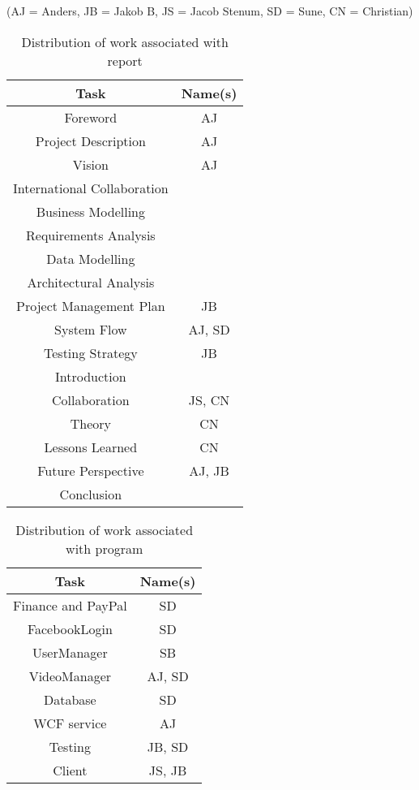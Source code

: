 \label{Distribution of Work}
(AJ = Anders, JB = Jakob B, JS = Jacob Stenum, SD = Sune, CN = Christian)\\
\begin{table}[H]
\caption{Distribution of work associated with report}
\centering

\begin{tabular}{c c}
Task & Name(s) \\ [1.5ex] 
\hline
Foreword & AJ \\
Project Description & AJ \\
Vision & AJ\\
International Collaboration & \\
Business Modelling & \\
Requirements Analysis & \\
Data Modelling & \\
Architectural Analysis & \\
Project Management Plan & JB \\
System Flow & AJ, SD\\
Testing Strategy & JB\\
Introduction & \\
Collaboration & JS, CN \\
Theory & CN \\
Lessons Learned & CN \\
Future Perspective & AJ, JB \\
Conclusion & \\

\end{tabular}
\end{table}
\newpage
\begin{table}[H]
\caption{Distribution of work associated with program}
\centering
\begin{tabular}{c c}
Task & Name(s)\\ [1.5ex] 
\hline
Finance and PayPal & SD \\
FacebookLogin & SD \\
UserManager & SB \\
VideoManager & AJ, SD \\
Database & SD \\
WCF service & AJ\\
Testing & JB, SD \\
Client & JS, JB\\


\end{tabular}
\end{table}

